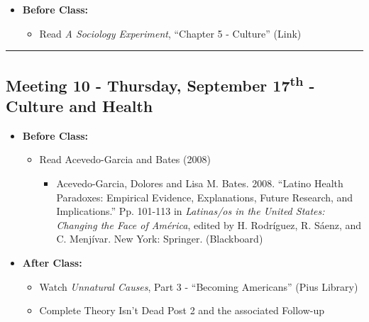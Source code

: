 \documentclass[
]{book}
\providecommand{\tightlist}{%
  \setlength{\itemsep}{0pt}\setlength{\parskip}{0pt}}
\begin{document}
\begin{itemize}
\tightlist
\item
  \textbf{Before Class:}

  \begin{itemize}
  \tightlist
  \item
    Read \emph{A Sociology Experiment}, ``Chapter 5 - Culture'' (Link)
  \end{itemize}
\end{itemize}

\begin{center}\rule{0.5\linewidth}{0.5pt}\end{center}

\hypertarget{meeting-10---thursday-september-17th---culture-and-health}{%
\subsection*{\texorpdfstring{Meeting 10 - Thursday, September 17\textsuperscript{th} - Culture and Health}{Meeting 10 - Thursday, September 17th - Culture and Health}}\label{meeting-10---thursday-september-17th---culture-and-health}}

\begin{itemize}
\tightlist
\item
  \textbf{Before Class:}

  \begin{itemize}
  \tightlist
  \item
    Read Acevedo-Garcia and Bates (2008)

    \begin{itemize}
    \tightlist
    \item
      Acevedo-Garcia, Dolores and Lisa M. Bates. 2008. ``Latino Health Paradoxes: Empirical Evidence, Explanations, Future Research, and Implications.'' Pp. 101-113 in \emph{Latinas/os in the United States: Changing the Face of América}, edited by H. Rodríguez, R. Sáenz, and C. Menjívar. New York: Springer. (Blackboard)
    \end{itemize}
  \end{itemize}
\item
  \textbf{After Class:}

  \begin{itemize}
  \tightlist
  \item
    Watch \emph{Unnatural Causes}, Part 3 - ``Becoming Americans'' (Pius Library)
  \item
    Complete Theory Isn't Dead Post 2 and the associated Follow-up
  \end{itemize}
\end{itemize}
\end{document}

